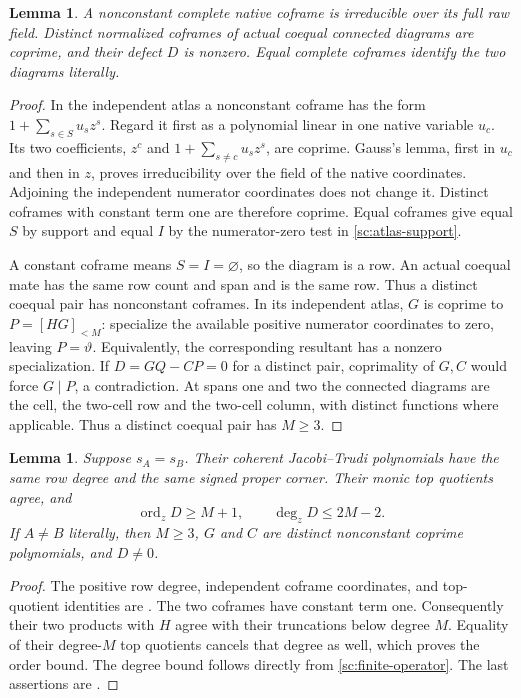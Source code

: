 \documentclass[11pt,a4paper]{amsart}
\numberwithin{equation}{section}
\theoremstyle{plain}
\newtheorem{lemma}[theorem]{Lemma}
\theoremstyle{definition}
\newcommand{\ord}{\operatorname{ord}}
\begin{document}
\begin{lemma}\label{sc:coprime}
A nonconstant complete native coframe is irreducible over its full
raw field.  Distinct normalized coframes of actual coequal connected
diagrams are coprime, and their defect \(D\) is nonzero.  Equal complete
coframes identify the two diagrams literally.
\end{lemma}
\begin{proof}
In the independent atlas a nonconstant coframe has the form
\(1+\sum_{s\in S}u_sz^s\).  Regard it first as a polynomial linear
in one native variable \(u_c\).  Its two coefficients, \(z^c\) and
\(1+\sum_{s\ne c}u_sz^s\), are coprime.  Gauss's lemma, first in
\(u_c\) and then in \(z\), proves irreducibility over the field of the
native coordinates.  Adjoining the independent numerator coordinates
does not change it.  Distinct coframes with constant term one are
therefore coprime.  Equal coframes give equal \(S\) by support and equal
\(I\) by the numerator-zero test in \eqref{sc:atlas-support}.

A constant coframe means \(S=I=\varnothing\), so the diagram is a row.
An actual coequal mate has the same row count and span and is the same
row.  Thus a distinct coequal pair has nonconstant coframes.
In its independent atlas, \(G\) is coprime to \(P=[HG]_{<M}\): specialize
the available positive numerator coordinates to zero, leaving \(P=\vartheta\).
Equivalently, the corresponding resultant has a nonzero
specialization.  If \(D=GQ-CP=0\) for a distinct pair, coprimality
of \(G,C\) would force \(G\mid P\), a contradiction.  At spans one and
two the connected diagrams are the cell, the two-cell row and the
two-cell column, with distinct functions where applicable.  Thus a
distinct coequal pair has \(M\ge3\).
\end{proof}

\begin{lemma}\label{sc:coequal-data}
Suppose \(s_A=s_B\).  Their coherent Jacobi--Trudi polynomials have the
same row degree and the same signed proper corner.  Their monic top
quotients agree, and
\begin{equation}\label{sc:defect-orders}
 \ord_z D\ge M+1,\qquad \deg_zD\le 2M-2.
\end{equation}
If \(A\ne B\) literally, then \(M\ge3\), \(G\) and \(C\) are distinct
nonconstant coprime polynomials, and \(D\ne0\).
\end{lemma}
\begin{proof}
The positive row degree, independent coframe coordinates, and top-quotient
identities are .  The two coframes
have constant term one.  Consequently their two products with \(H\)
agree with their truncations below degree \(M\).  Equality of their
degree-\(M\) top quotients cancels that degree as well, which proves the
order bound.  The degree bound follows directly from
\eqref{sc:finite-operator}.  The last assertions are
.
\end{proof}
\end{document}
